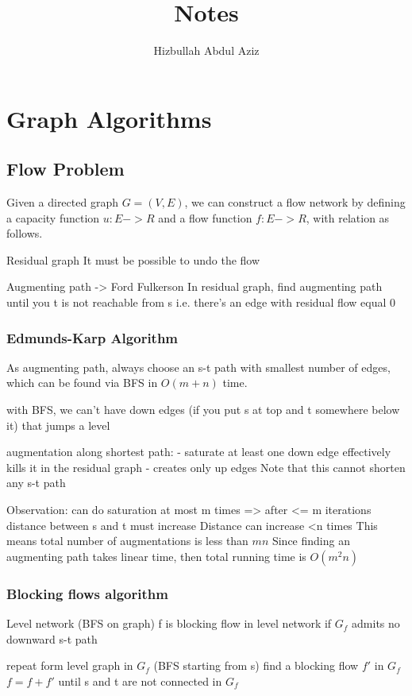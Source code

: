 \documentclass{article}
\author{Hizbullah Abdul Aziz}
\title{Notes}
\begin{document}
\maketitle

\section{Graph Algorithms}

\subsection{Flow Problem}
Given a directed graph $G=(V, E)$, we can construct a flow network by
defining a capacity function $u: E -> R$ and a flow function $f: E ->
R$, with relation as follows.

Residual graph
It must be possible to undo the flow

Augmenting path -> Ford Fulkerson
In residual graph, find augmenting path until you t is not reachable from
s i.e. there's an edge with residual flow equal 0

\subsubsection{Edmunds-Karp Algorithm}
As augmenting path, always choose an s-t path with smallest number of edges,
which can be found via BFS in $O(m + n)$ time.

with BFS, we can't have down edges (if you put s at top and t somewhere below it) that jumps a level

augmentation along shortest path:
- saturate at least one down edge effectively kills it in the residual graph
- creates only up edges
Note that this cannot shorten any s-t path

Observation: can do saturation at most m times
=> after <= m iterations distance between s and t must increase
Distance can increase <n times
This means total number of augmentations is less than $mn$
Since finding an augmenting path takes linear time, then total running time is $O(m^2n)$

\subsubsection{Blocking flows algorithm}
Level network (BFS on graph)
f is blocking flow in level network if $G_f$ admits no downward s-t path

repeat
	form level graph in $G_f$ (BFS starting from s)
	find a blocking flow $f'$ in $G_f$
	$f = f + f'$
until s and t are not connected in $G_f$
\end{document}
